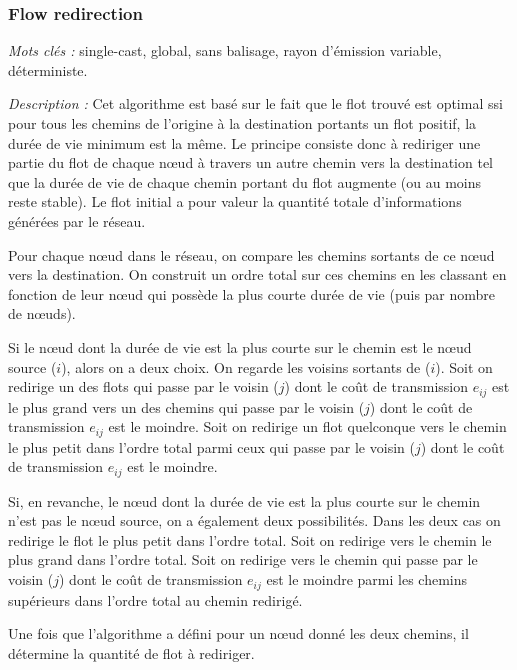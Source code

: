\subsubsection{Flow redirection \cite{Chang2000}}
\emph{Mots clés :} single-cast, global, sans balisage, rayon d'émission variable, déterministe.

\emph{Description :}
Cet algorithme est basé sur le fait que le flot trouvé est optimal ssi pour tous les chemins de l'origine à la destination portants un flot positif, la durée de vie minimum est la même. Le principe consiste donc à rediriger une partie du flot de chaque nœud à travers un autre chemin vers la destination tel que la durée de vie de chaque chemin portant du flot augmente (ou au moins reste stable). Le flot initial a pour valeur la quantité totale d'informations générées par le réseau.

Pour chaque nœud dans le réseau, on compare les chemins sortants de ce nœud vers la destination. On construit un ordre total sur ces chemins en les classant en fonction de leur nœud qui possède la plus courte durée de vie (puis par nombre de nœuds).

Si le nœud dont la durée de vie est la plus courte sur le chemin est le nœud source ($i$), alors on a deux choix. On regarde les voisins sortants de ($i$). Soit on redirige un des flots qui passe par le voisin ($j$) dont le coût de transmission $e_{ij}$ est le plus grand vers un des chemins qui passe par le voisin ($j$) dont le coût de transmission $e_{ij}$ est le moindre. Soit on redirige un flot quelconque vers le chemin le plus petit dans l'ordre total parmi ceux qui passe par le voisin ($j$) dont le coût de transmission $e_{ij}$ est le moindre.

Si, en revanche, le nœud dont la durée de vie est la plus courte sur le chemin n'est pas le nœud source, on a également deux possibilités. Dans les deux cas on redirige le flot le plus petit dans l'ordre total. Soit on redirige vers le chemin le plus grand dans l'ordre total. Soit on redirige vers le chemin qui passe par le voisin ($j$) dont le coût de transmission $e_{ij}$ est le moindre parmi les chemins supérieurs dans l'ordre total au chemin redirigé.

Une fois que l'algorithme a défini pour un nœud donné les deux chemins, il détermine la quantité de flot à rediriger.

